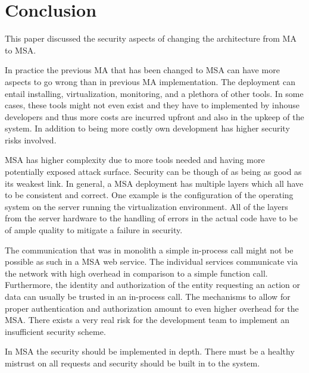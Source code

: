 \section{Conclusion}
\begin{sloppypar}
    This paper discussed the security aspects of changing the architecture from 
    MA to MSA. 
\end{sloppypar}
\begin{sloppypar}
    In practice the previous MA that has been changed to MSA can have more 
    aspects to go wrong than in previous MA implementation. The deployment can 
    entail installing, virtualization, monitoring, and a plethora of other 
    tools. In some cases, these tools might not even exist and they have to 
    implemented by inhouse developers and thus more costs are incurred upfront 
    and also in the upkeep of the system. In addition to being more costly own 
    development has higher security risks involved.
\end{sloppypar}
\begin{sloppypar}
    MSA has higher complexity due to more tools needed and having more 
    potentially exposed attack surface. Security can be though of as being as 
    good as its weakest link. In general, a MSA deployment has multiple layers 
    which all have to be consistent and correct. One example is the 
    configuration of the operating system on the server running the 
    virtualization environment. All of the layers from the server hardware to 
    the handling of errors in the actual code have to be of ample quality to 
    mitigate a failure in security.
\end{sloppypar}
\begin{sloppypar}
    The communication that was in monolith a simple in-process call might not be 
    possible as such in a MSA web service. The individual services communicate 
    via the network with high overhead in comparison to a simple function call. 
    Furthermore, the identity and authorization of the entity requesting an action 
    or data can usually be trusted in an in-process call. The mechanisms to 
    allow for proper authentication and authorization amount to even higher 
    overhead for the MSA. There exists a very real risk for the development 
    team to implement an insufficient security scheme.
\end{sloppypar}
\begin{sloppypar}
    In MSA the security should be implemented in depth. There must be a healthy 
    mistrust on all requests and security should be built in to the system.
\end{sloppypar}
